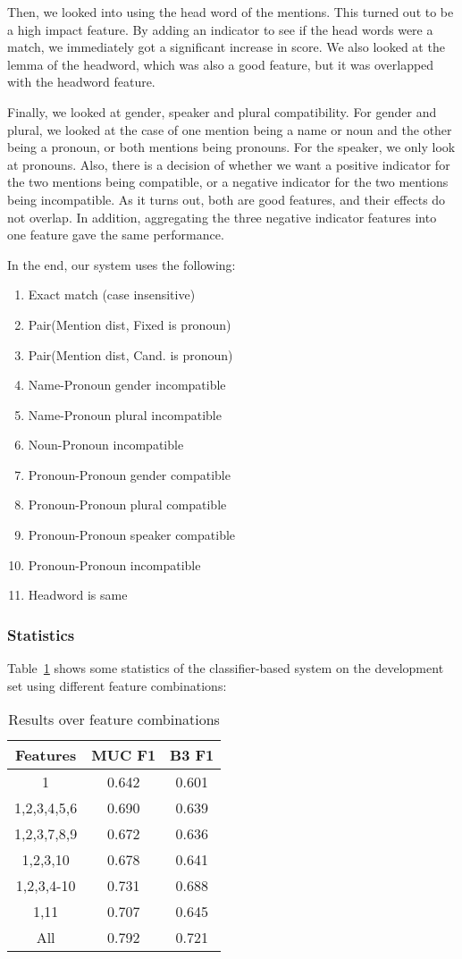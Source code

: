 \documentclass[12pt, twocolumn]{article}
\begin{document}
Then, we looked into using the head word of the mentions. This turned out to be a high impact feature. By adding an indicator to see if the head words were a match, we immediately got a significant increase in score. We also looked at the lemma of the headword, which was also a good feature, but it was overlapped with the headword feature.

Finally, we looked at gender, speaker and plural compatibility. For gender and plural, we looked at the case of one mention being a name or noun and the other being a pronoun, or both mentions being pronouns. For the speaker, we only look at pronouns. Also, there is a decision of whether we want a positive indicator for the two mentions being compatible, or a negative indicator for the two mentions being incompatible. As it turns out, both are good features, and their effects do not overlap. In addition, aggregating the three negative indicator features into one feature gave the same performance.

In the end, our system uses the following:
\begin{enumerate}[(1)]
\item Exact match (case insensitive)
\item Pair(Mention dist, Fixed is pronoun) 
\item Pair(Mention dist, Cand. is pronoun) 
\item Name-Pronoun gender incompatible
\item Name-Pronoun plural incompatible
\item Noun-Pronoun incompatible
\item Pronoun-Pronoun gender compatible
\item Pronoun-Pronoun plural compatible
\item Pronoun-Pronoun speaker compatible
\item Pronoun-Pronoun incompatible
\item Headword is same
\end{enumerate}
\subsubsection{Statistics}
Table~\ref{tab:features} shows some statistics of the classifier-based system on the development set using different feature combinations:
\begin{table}[H]
\begin{center}
\begin{tabular}{|c|c|c|}
\hline
Features & MUC F1 & B3 F1\\\hline
1 & 0.642 & 0.601 \\\hline
1,2,3,4,5,6 & 0.690 & 0.639\\\hline
1,2,3,7,8,9 & 0.672 & 0.636\\\hline
1,2,3,10 & 0.678 & 0.641 \\\hline
1,2,3,4-10 & 0.731 & 0.688 \\\hline
1,11 & 0.707 & 0.645 \\\hline
All & 0.792 & 0.721 \\\hline
\end{tabular}
\end{center}
\caption{Results over feature combinations}
\label{tab:features}
\end{table}
\end{document}
